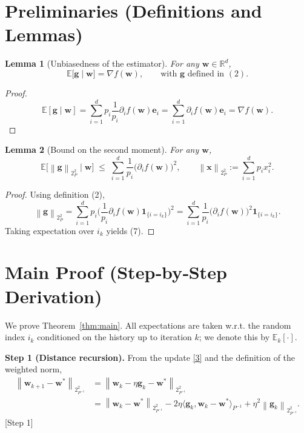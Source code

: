 \documentclass{article}
\newtheorem{lemma}{Lemma}
\newcommand{\E}{\mathbb{E}}
\newcommand{\R}{\mathbb{R}}
\newcommand{\ip}[2]{\langle #1,#2\rangle}
\newcommand{\norm}[2][2]{\left\lVert #2\right\rVert_{#1}}
\newcommand{\evec}{\mathbf{e}}
\newcommand{\grad}{\nabla}
\begin{document}
\newpage
\section*{Preliminaries (Definitions and Lemmas)}
\begin{lemma}[Unbiasedness of the estimator]\label{lem:unbiased}
For any $\mathbf{w}\in\R^{d}$,
\[
\E\big[\mathbf{g}\mid \mathbf{w}\big]=\grad f(\mathbf{w}),
\qquad\text{with }\mathbf{g}\text{ defined in }(2).
\]
\end{lemma}
\begin{proof}
\[
\E[\mathbf{g}\mid\mathbf{w}]
= \sum_{i=1}^{d} p_i \frac{1}{p_i}\partial_i f(\mathbf{w})\evec_i
= \sum_{i=1}^{d}\partial_i f(\mathbf{w})\evec_i
= \grad f(\mathbf{w}) .
\tag{6}
\]
\end{proof}

\begin{lemma}[Bound on the second moment]\label{lem:second}
For any $\mathbf{w}$,
\[
\E\!\big[\norm{\mathbf{g}}_{P}^{2}\mid\mathbf{w}\big]
\;\le\;
\sum_{i=1}^{d}\frac{1}{p_i}\big(\partial_i f(\mathbf{w})\big)^{2},
\qquad 
\norm{\mathbf{x}}_{P}^{2}:=\sum_{i=1}^{d}p_i x_i^{2}.
\tag{7}
\]
\end{lemma}
\begin{proof}
Using definition (2),
\[
\norm{\mathbf{g}}_{P}^{2}
= \sum_{i=1}^{d}p_i\Big(\frac{1}{p_i}\partial_i f(\mathbf{w})\mathbf{1}_{\{i=i_k\}}\Big)^{2}
= \sum_{i=1}^{d}\frac{1}{p_i}\big(\partial_i f(\mathbf{w})\big)^{2}\mathbf{1}_{\{i=i_k\}} .
\]
Taking expectation over $i_k$ yields (7).
\end{proof}

\section*{Main Proof (Step‑by‑Step Derivation)}
We prove Theorem~\ref{thm:main}.  
All expectations are taken w.r.t. the random index $i_k$ conditioned on the history up to iteration $k$; we denote this by $\E_k[\cdot]$.

\noindent\textbf{Step 1 (Distance recursion).}  
From the update \eqref{3} and the definition of the weighted norm,
\begin{align}
\norm{\mathbf{w}_{k+1}-\mathbf{w}^{*}}_{P^{-1}}^{2}
&= \norm{\mathbf{w}_{k}-\eta\mathbf{g}_k-\mathbf{w}^{*}}_{P^{-1}}^{2}\nonumber\\
&= \norm{\mathbf{w}_{k}-\mathbf{w}^{*}}_{P^{-1}}^{2}
     -2\eta\!\ip{\mathbf{g}_k}{\mathbf{w}_{k}-\mathbf{w}^{*}}_{P^{-1}}
     +\eta^{2}\norm{\mathbf{g}_k}_{P^{-1}}^{2}.
\tag{8}
\end{align}
[Step 1]
\end{document}
